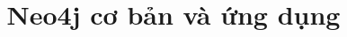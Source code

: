 %
%
%
% 
%
\title{Neo4j cơ bản và ứng dụng}

\documentclass[12pt]{article}
\usepackage[T5]{fontenc}
\usepackage[utf8]{inputenc}
\usepackage[vietnamese,english]{babel}
\usepackage{amsmath}
\usepackage{graphicx}
\usepackage[colorinlistoftodos]{todonotes}

\usepackage{hyperref}
\hypersetup{
    colorlinks=true,
    linkcolor=blue,
    filecolor=magenta,      
    urlcolor=cyan,
}




